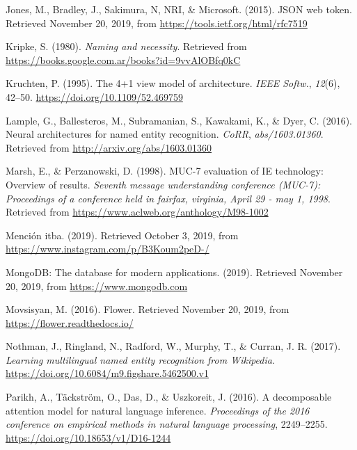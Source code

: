 \documentclass[12pt,a4paper,]{scrartcl}
\begin{document}
\leavevmode\hypertarget{ref-JWT}{}%
Jones, M., Bradley, J., Sakimura, N, NRI, \& Microsoft. (2015). JSON web token. Retrieved November 20, 2019, from \url{https://tools.ietf.org/html/rfc7519}

\leavevmode\hypertarget{ref-kripke1980naming}{}%
Kripke, S. (1980). \emph{Naming and necessity}. Retrieved from \url{https://books.google.com.ar/books?id=9vvAlOBfq0kC}

\leavevmode\hypertarget{ref-Kruchten:1995:VMA:624610.625529}{}%
Kruchten, P. (1995). The 4+1 view model of architecture. \emph{IEEE Softw.}, \emph{12}(6), 42--50. \url{https://doi.org/10.1109/52.469759}

\leavevmode\hypertarget{ref-DBLP:journalsux2fcorrux2fLampleBSKD16}{}%
Lample, G., Ballesteros, M., Subramanian, S., Kawakami, K., \& Dyer, C. (2016). Neural architectures for named entity recognition. \emph{CoRR}, \emph{abs/1603.01360}. Retrieved from \url{http://arxiv.org/abs/1603.01360}

\leavevmode\hypertarget{ref-marsh-perzanowski-1998-muc}{}%
Marsh, E., \& Perzanowski, D. (1998). MUC-7 evaluation of IE technology: Overview of results. \emph{Seventh message understanding conference (MUC-7): Proceedings of a conference held in fairfax, virginia, April 29 - may 1, 1998}. Retrieved from \url{https://www.aclweb.org/anthology/M98-1002}

\leavevmode\hypertarget{ref-mediaparty2019_win}{}%
Mención itba. (2019). Retrieved October 3, 2019, from \url{https://www.instagram.com/p/B3Koum2peD-/}

\leavevmode\hypertarget{ref-mongodb}{}%
MongoDB: The database for modern applications. (2019). Retrieved November 20, 2019, from \url{https://www.mongodb.com}

\leavevmode\hypertarget{ref-flower}{}%
Movsisyan, M. (2016). Flower. Retrieved November 20, 2019, from \url{https://flower.readthedocs.io/}

\leavevmode\hypertarget{ref-Nothman2017}{}%
Nothman, J., Ringland, N., Radford, W., Murphy, T., \& Curran, J. R. (2017). \emph{Learning multilingual named entity recognition from Wikipedia}. \url{https://doi.org/10.6084/m9.figshare.5462500.v1}

\leavevmode\hypertarget{ref-parikh-etal-2016-decomposable}{}%
Parikh, A., Täckström, O., Das, D., \& Uszkoreit, J. (2016). A decomposable attention model for natural language inference. \emph{Proceedings of the 2016 conference on empirical methods in natural language processing}, 2249--2255. \url{https://doi.org/10.18653/v1/D16-1244}
\end{document}
